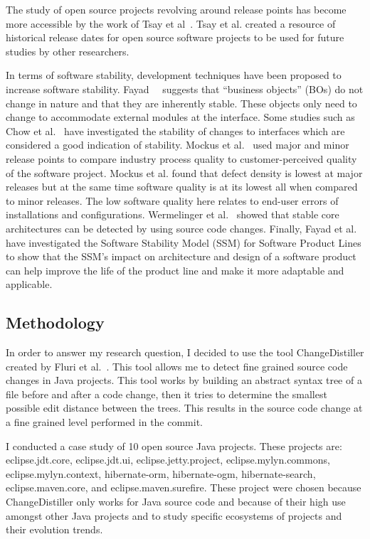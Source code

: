 The study of open source projects revolving around release points has become more accessible by the work of Tsay et al~\cite{Tsay:2011:EMO}. Tsay et al. created
a resource of historical release dates for open source software projects to be used for future studies by other researchers.

In terms of software stability, development techniques have been proposed to increase software stability. 
Fayad~\cite{Fayad:2001:TOI}~\cite{Fayad:2002:ASS} suggests that ``business objects'' (BOs) do not change in nature and that they are inherently stable. These
objects only need to change to accommodate external modules at the interface. Some studies such as Chow et al.~\cite{Chow:2011:SJI} have investigated
the stability of changes to interfaces which are considered a good indication of stability.
Mockus et al.~\cite{Mockus:2008:IQR} used major and minor release points to compare industry process quality to customer-perceived quality of the software
project. Mockus et al. found that defect density is lowest at major releases but at the same time software quality is at its lowest all when compared to minor
releases. The low software quality here relates to end-user errors of installations and configurations. Wermelinger et al.~\cite{Wermelinger:2008:AEE}
showed that stable core architectures can be detected by using source code changes. Finally, Fayad et al.~\cite{Fayad:2010:SSM} have
investigated the Software Stability Model (SSM) for Software Product Lines to show that the SSM's impact on architecture and design of a software product
can help improve the life of the product line and make it more adaptable and applicable.

\subsection{Methodology}
\label{sec:apie-meth}
In order to answer my research question, I decided to use the tool ChangeDistiller created by Fluri et al.~\cite{Fluri:2007:CDT}. This tool allows me to detect fine grained
source code changes in Java projects. This tool works by building an abstract syntax tree of a file before and after a code change, then it tries to determine
the smallest possible edit distance between the trees. This results in the source code change at a fine grained level performed in the commit.

I conducted a case study of 10 open source Java projects. These projects are: eclipse.jdt.core, eclipse.jdt.ui, eclipse.jetty.project, 
eclipse.mylyn.commons, eclipse.mylyn.context, hibernate-orm, hibernate-ogm, hibernate-search, eclipse.maven.core, and eclipse.maven.surefire. These project were chosen
because ChangeDistiller only works for Java source code and because of their high use amongst other Java projects and to study specific ecosystems 
of projects and their evolution trends.

